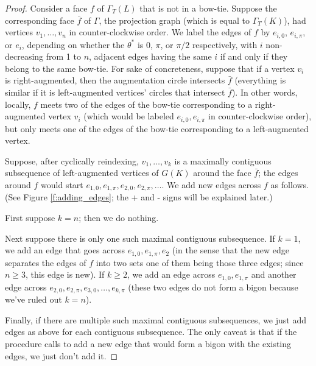 \documentclass[11pt]{amsart}
\theoremstyle{plain}
\theoremstyle{definition}
\begin{document}
\begin{proof}
Consider a face $f$ of $\Gamma_T(L)$ that is not in a bow-tie.
Suppose the corresponding face $\bar{f}$ of $\Gamma$,
the projection graph (which is equal to $\Gamma_T(K)$),
had vertices $v_1,\ldots,v_n$ in counter-clockwise order.
We label the edges of $f$ by $e_{i,0}$, $e_{i,\pi}$, or $e_i$,
depending on whether the $\theta^*$ is $0$, $\pi$, or $\pi/2$ respectively,
with $i$ non-decreasing from 1 to $n$,
adjacent edges having the same $i$ if and only if they
belong to the same bow-tie.
For sake of concreteness,
suppose that if a vertex $v_i$ is right-augmented,
then the augmentation circle intersects $\bar{f}$
(everything is similar if it is left-augmented vertices' circles
that intersect $\bar{f}$).
In other words, locally, $f$ meets two of the edges of the bow-tie
corresponding to a right-augmented vertex $v_i$
(which would be labeled $e_{i,0}, e_{i,\pi}$ in counter-clockwise order),
but only meets one of the edges of the bow-tie corresponding to
a left-augmented vertex.


Suppose, after cyclically reindexing, $v_1,\ldots,v_k$
is a maximally contiguous subsequence of left-augmented vertices
of $G(K)$ around the face $\bar{f}$;
the edges around $f$ would start
$e_{1,0}, e_{1,\pi}, e_{2,0}, e_{2,\pi}, \ldots$.
We add new edges across $f$ as follows.
(See Figure \ref{f:adding_edges}; the + and - signs will be explained later.)


First suppose $k=n$; then we do nothing.

Next suppose there is only one such maximal contiguous subsequence.
If $k = 1$, we add an edge that goes across
$e_{1,0},e_{1,\pi},e_2$
(in the sense that the new edge separates the edges of $f$ into two sets
one of them being those three edges;
since $n\geq 3$, this edge is new).
If $k \geq 2$,
we add an edge across $e_{1,0},e_{1,\pi}$
and another edge across $e_{2,0},e_{2,\pi},e_{3,0},\ldots,e_{k,\pi}$
(these two edges do not form a bigon because we've ruled out $k=n$).

Finally, if there are multiple such maximal contiguous subsequences,
we just add edges as above for each contiguous subsequence.
The only caveat is that if the procedure calls to add a new edge
that would form a bigon with the existing edges,
we just don't add it.



\end{proof}
\end{document}
